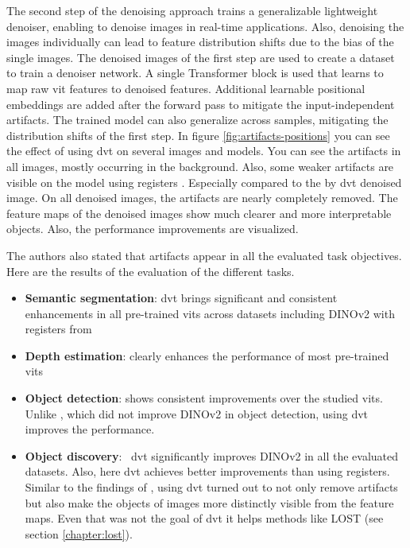 \documentclass[conference]{IEEEtran}
\begin{document}
  The second step of the denoising approach trains a generalizable lightweight denoiser, enabling to denoise images in real-time applications. Also, denoising the images individually can lead to feature distribution shifts due to the bias of the single images. The denoised images of the first step are used to create a dataset to train a denoiser network. A single Transformer block is used that learns to map raw \ac{vit} features to denoised features. Additional learnable positional embeddings are added after the forward pass to mitigate the input-independent artifacts. The trained model can also generalize across samples, mitigating the distribution shifts of the first step. In figure \ref{fig:artifacts-positions} you can see the effect of using \ac{dvt} on several images and models. You can see the artifacts in all images, mostly occurring in the background. Also, some weaker artifacts are visible on the model using registers \cite{registers}. Especially compared to the by \ac{dvt} denoised image. On all denoised images, the artifacts are nearly completely removed. The feature maps of the denoised images show much clearer and more interpretable objects. Also, the performance improvements are visualized. \cite{denoising}
 
  The authors also stated that artifacts appear in all the evaluated task objectives. Here are the results of the evaluation of the different tasks.
  \begin{itemize}
    \item \textbf{Semantic segmentation}: \ac{dvt} brings significant and consistent
    enhancements in all pre-trained \acp{vit} across datasets including \mbox{DINOv2} with registers from \citeauthor{registers} \cite{registers}
    \item \textbf{Depth estimation}: clearly enhances the performance of most pre-trained \acp{vit}
    \item \textbf{Object detection}: shows consistent improvements over the studied \acp{vit}. Unlike \citeauthor{registers} \cite{registers}, which did not improve \mbox{DINOv2} in object detection, using \ac{dvt} improves the performance.
    \item \textbf{Object discovery}:  \ac{dvt} significantly improves
    \mbox{DINOv2} in all the evaluated datasets. Also, here \ac{dvt} achieves better improvements than \citeauthor{registers} \cite{registers} using registers. Similar to the findings of \citeauthor{registers} \cite{registers}, using \ac{dvt} turned out to not only remove artifacts but also make the objects of images more distinctly visible from the feature maps. Even that was not the goal of \ac{dvt} it helps methods like \mbox{LOST} (see section \ref{chapter:lost}). \cite{denoising}
  \end{itemize}
\end{document}
